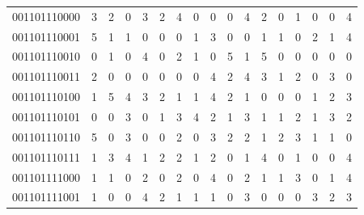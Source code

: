 \documentclass[10pt,a4paper]{article}
\begin{document}
\begin{longtable}{ |c|c|c|c|c|c|c|c|c|c|c|c|c|c|c|c|c| }
    001101110000              & 3                            & 2                                & 0                            & 3                              & 2   & 4   & 0   & 0   & 0   & 4   & 2   & 0   & 1   & 0   & 0   & 4   \\
    001101110001              & 5                            & 1                                & 1                            & 0                              & 0   & 0   & 1   & 3   & 0   & 0   & 1   & 1   & 0   & 2   & 1   & 4   \\
    001101110010              & 0                            & 1                                & 0                            & 4                              & 0   & 2   & 1   & 0   & 5   & 1   & 5   & 0   & 0   & 0   & 0   & 0   \\
    001101110011              & 2                            & 0                                & 0                            & 0                              & 0   & 0   & 0   & 4   & 2   & 4   & 3   & 1   & 2   & 0   & 3   & 0   \\
    001101110100              & 1                            & 5                                & 4                            & 3                              & 2   & 1   & 1   & 4   & 2   & 1   & 0   & 0   & 0   & 1   & 2   & 3   \\
    001101110101              & 0                            & 0                                & 3                            & 0                              & 1   & 3   & 4   & 2   & 1   & 3   & 1   & 1   & 2   & 1   & 3   & 2   \\
    001101110110              & 5                            & 0                                & 3                            & 0                              & 0   & 2   & 0   & 3   & 2   & 2   & 1   & 2   & 3   & 1   & 1   & 0   \\
    001101110111              & 1                            & 3                                & 4                            & 1                              & 2   & 2   & 1   & 2   & 0   & 1   & 4   & 0   & 1   & 0   & 0   & 4   \\
    001101111000              & 1                            & 1                                & 0                            & 2                              & 0   & 2   & 0   & 4   & 0   & 2   & 1   & 1   & 3   & 0   & 1   & 4   \\
    001101111001              & 1                            & 0                                & 0                            & 4                              & 2   & 1   & 1   & 1   & 0   & 3   & 0   & 0   & 0   & 3   & 2   & 3   \\

\end{longtable}
\end{document}
